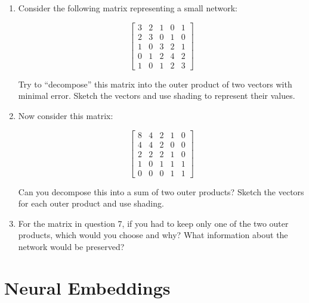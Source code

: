 \documentclass[a4paper, 14pt]{extarticle}
\begin{document}
\begin{enumerate}[resume]
    \item Consider the following matrix representing a small network:

    \[
    \begin{bmatrix}
    3 & 2 & 1 & 0 & 1 \\
    2 & 3 & 0 & 1 & 0 \\
    1 & 0 & 3 & 2 & 1 \\
    0 & 1 & 2 & 4 & 2 \\
    1 & 0 & 1 & 2 & 3
    \end{bmatrix}
    \]

    Try to ``decompose'' this matrix into the outer product of two vectors with minimal error. Sketch the vectors and use shading to represent their values.
    \vspace{3cm}
    \item Now consider this matrix:

    \[
    \begin{bmatrix}
    8 & 4 & 2 & 1 & 0 \\
    4 & 4 & 2 & 0 & 0 \\
    2 & 2 & 2 & 1 & 0 \\
    1 & 0 & 1 & 1 & 1 \\
    0 & 0 & 0 & 1 & 1
    \end{bmatrix}
    \]

    Can you decompose this into a sum of two outer products? Sketch the vectors for each outer product and use shading.
    \vspace{3cm}
    \item For the matrix in question 7, if you had to keep only one of the two outer products, which would you choose and why? What information about the network would be preserved?
    \vspace{3cm}
\end{enumerate}

\clearpage
\section{Neural Embeddings}
\end{document}

